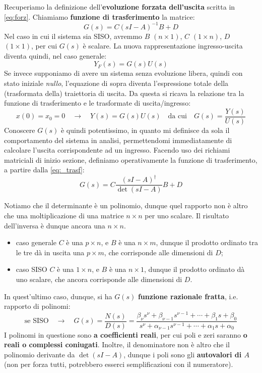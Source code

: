 \begin{defin}{}{}
Recuperiamo la definizione dell'\textbf{evoluzione forzata dell'uscita} scritta in \eqref{eq:forz}. Chiamiamo  \textbf{funzione di trasferimento} la matrice:
\begin{equation}
\label{eq:_trasf}
G(s) = C(sI-A)^{-1}B + D
\end{equation}
Nel caso in cui il sistema sia SISO, avremmo $B$ $(n\times 1)$, $C$ $(1 \times n)$, $D$ $(1 \times 1)$, per cui $G(s)$ è scalare. La nuova rappresentazione ingresso-uscita diventa quindi, nel caso generale:
\begin{equation}
Y_F(s) = G(s)U(s)
\end{equation}
Se invece supponiamo di avere un sistema senza evoluzione libera, quindi con stato iniziale \textit{nullo}, l'equazione di sopra diventa l'espressione totale della (trasformata della) traiettoria di uscita. Da questa si ricava la relazione tra la funzione di trasferimento e le trasformate di uscita/ingresso:
\begin{equation}
	x(0) = x_0 = 0 \quad \rightarrow \quad Y(s) = G(s)U(s) \quad \textrm{da cui} \quad \boxed{G(s) = \frac{Y(s)}{U(s)}}
\end{equation}
Conoscere $G(s)$ è quindi potentissimo, in quanto mi definisce da sola il comportamento del sistema in analisi, permettendomi immediatamente di calcolare l'uscita corrispondente ad un ingresso.
\bb
Facendo uso dei richiami matriciali di inizio sezione, definiamo operativamente la funzione di trasferimento, a partire dalla \eqref{eq:_trasf}:
\begin{equation}
G(s) = C \frac{(sI-A)^\dag}{\det(sI-A)}B+D
\end{equation} 
\end{defin}
Notiamo che il determinante è un polinomio, dunque quel rapporto non è altro che una moltiplicazione di una matrice $n\times n$ per uno scalare. Il risultato dell'inversa è dunque ancora una $n\times n$.
\begin{itemize}
\item caso generale \rarr $C$ è una $p \times n$, e $B$ è una $n \times m$, dunque il prodotto ordinato tra le tre dà in uscita una $p \times m$, che corrisponde alle dimensioni di $D$;
\item caso SISO \rarr $C$ è una $1\times n$, e $B$ è una $n\times 1$, dunque il prodotto ordinato dà uno scalare, che ancora corrisponde alle dimensioni di $D$.
\end{itemize}
In quest'ultimo caso, dunque, si ha $G(s)$ \textbf{funzione razionale fratta}, i.e. rapporto di polinomi:
\begin{equation}
\textrm{se SISO} \quad \rightarrow \quad G(s) = \frac{N(s)}{D(s)} = \frac{\beta_\nu s^\nu + \beta_{\nu -1} s^{\nu -1} + \cdots + \beta_1 s + \beta_0}{s^\nu + \alpha_{\nu - 1}s^{\nu -1} + \cdots + \alpha_1 s + \alpha_0} 
\end{equation}
I polinomi in questione sono \textbf{a coefficienti reali}, per cui poli e zeri saranno \textbf{o reali o complessi coniugati}. Inoltre, il denominatore non è altro che il polinomio derivante da $\det(sI-A)$, dunque i poli sono gli \textbf{autovalori di $A$} (non per forza tutti, potrebbero esserci semplificazioni con il numeratore). 

